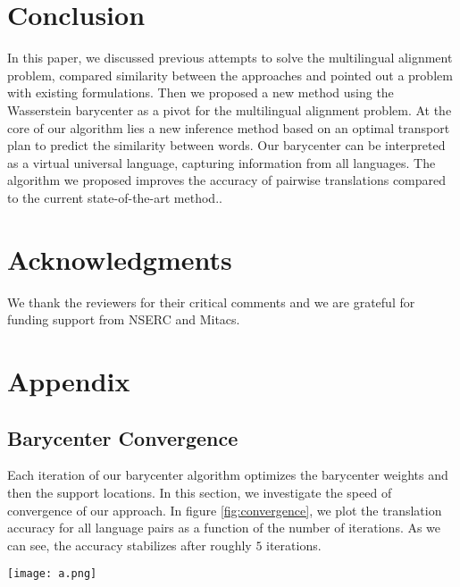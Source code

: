 \documentclass{article}
\begin{document}
\section{Conclusion}


In this paper, we discussed previous attempts to solve the multilingual alignment problem, compared similarity between the approaches and pointed out a problem with existing formulations.
Then we proposed a new method using the Wasserstein barycenter as a pivot for the multilingual alignment problem. 
At the core of our algorithm lies a new inference method based on an optimal transport plan to predict the similarity between words. 
Our barycenter can be interpreted as a virtual universal language, capturing information from all languages. 
The algorithm we proposed improves the accuracy of pairwise translations compared to the current state-of-the-art method..


\section*{Acknowledgments}

We thank the reviewers for their critical comments and we are grateful for funding support from 
NSERC and Mitacs.

 \clearpage





\section{Appendix}

\subsection{Barycenter Convergence} Each iteration of our barycenter algorithm optimizes the barycenter weights and then the support locations. In this section, we investigate the speed of convergence of our approach. 
In figure \ref{fig:convergence}, we plot the translation accuracy for all language pairs as a function of the number of iterations. As we can see, the accuracy stabilizes after roughly $5$ iterations.

\begin{figure*}
    \centering
    \texttt{[image: a.png]}
    \caption{Translation accuracies for language pairs as a function of the number of iterations. The barycenter stabilizes after the $5$-th iteration.}
    \label{fig:convergence}
\end{figure*}
\end{document}
